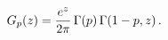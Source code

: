 \[\mathop{G_{p}\/}\nolimits\!\left(z\right)=\frac{e^{z}}{2\pi}\mathop{\Gamma\/}%
\nolimits\!\left(p\right)\mathop{\Gamma\/}\nolimits\!\left(1-p,z\right).\]